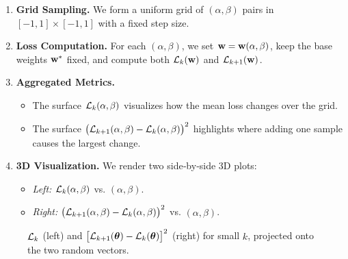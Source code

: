 \documentclass{article}
\begin{document}
\begin{enumerate}
  \item \textbf{Grid Sampling.}
        We form a uniform grid of $(\alpha, \beta)$ pairs in $[-1,1]\times[-1,1]$ with a fixed step size.
  \item \textbf{Loss Computation.}
        For each $(\alpha,\beta)$, we set $\mathbf{w}=\mathbf{w}(\alpha,\beta)$, keep the base weights $\mathbf{w}^*$ fixed, and compute both
        $\mathcal{L}_k(\mathbf{w})$ and $\mathcal{L}_{k+1}(\mathbf{w})$.
  \item \textbf{Aggregated Metrics.}
        \begin{itemize}
          \item The surface $\mathcal{L}_k(\alpha,\beta)$ visualizes how the mean loss changes over the grid.
          \item The surface $\bigl( \mathcal{L}_{k+1} (\alpha, \beta) - \mathcal{L}_k (\alpha, \beta) \bigr)^2$ highlights where adding one sample
                causes the largest change.
        \end{itemize}
  \item \textbf{3D Visualization.}
        We render two side‐by‐side 3D plots:
        \begin{itemize}
          \item \emph{Left:} $\mathcal{L}_k (\alpha, \beta)$ vs. $(\alpha, \beta)$.
          \item \emph{Right:} $\bigl( \mathcal{L}_{k+1} (\alpha, \beta) - \mathcal{L}_k (\alpha, \beta) \bigr)^2$ vs. $(\alpha, \beta)$.
        \end{itemize}
\end{enumerate}

\begin{figure}[!htbp]
  \hspace*{-2.2cm}
  \caption{$\mathcal{L}_k$ (left) and $\bigl[ \mathcal{L}_{k+1}(\boldsymbol{\theta}) - \mathcal{L}_k(\boldsymbol{\theta}) \bigr]^2$ (right) for small $k$, projected onto the two random vectors.}
  \label{fig:loss_random_small}
\end{figure}
\end{document}
